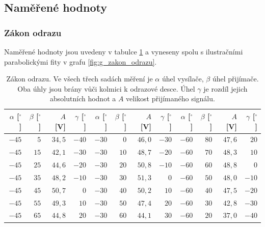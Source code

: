 \documentclass[english]{article}
\begin{document}
\subsection{Naměřené hodnoty}

	\subsubsection{Zákon odrazu}
		Naměřené hodnoty jsou uvedeny v tabulce \ref{tab:zakon_odrazu} a vyneseny spolu s ilustračními parabolickými fity v grafu \ref{fig:g_zakon_odrazu}.
	
	\begin{table}[h]
	\begin{center}
	\begin{tabular}{|r|r|r|r||r|r|r|r||r|r|r|r|}
	\hline
	       $\alpha$ [$^\circ$] & $\beta$ [$^\circ$] & $A$ [V] & $\gamma$ [$^\circ$] & $\alpha$ [$^\circ$] & $\beta$ [$^\circ$] & $A$ [V] & $\gamma$ [$^\circ$] & $\alpha$ [$^\circ$] & $\beta$ [$^\circ$] & $A$ [V] & $\gamma$ [$^\circ$]\\\hline \hline
	       $-45$ & $5$ & $34,5$ & $-40$ & $-30$ & $0$ & $46,0$ & $-30$ & $-60$ & $80$ & $47,6$ & $20$\\\hline
	       $-45$ & $15$ & $42,1$ & $-30$ & $-30$ & $10$ & $48,7$ & $-20$ & $-60$ & $70$ & $48,3$ & $10$\\\hline
	       $-45$ & $25$ & $44,6$ & $-20$ & $-30$ & $20$ & $50,8$ & $-10$ & $-60$ & $60$ & $48,8$ & $0$\\\hline
	       $-45$ & $35$ & $48,2$ & $-10$ & $-30$ & $30$ & $51,3$ & $0$ & $-60$ & $50$ & $48,0$ & $-10$\\\hline
	       $-45$ & $45$ & $50,7$ & $0$ & $-30$ & $40$ & $50,2$ & $10$ & $-60$ & $40$ & $47,5$ & $-20$\\\hline
	       $-45$ & $55$ & $49,3$ & $10$ & $-30$ & $50$ & $47,4$ & $20$ & $-60$ & $30$ & $42,8$ & $-30$\\\hline
	       $-45$ & $65$ & $44,8$ & $20$ & $-30$ & $60$ & $44,1$ & $30$ & $-60$ & $20$ & $37,0$ & $-40$\\\hline
	
	\end{tabular}
	\caption{Zákon odrazu. Ve všech třech sadách měření je $\alpha$ úhel vysílače, $\beta$ úhel přijímače. Oba úhly jsou brány vůči kolmici k odrazové desce. Úhel $\gamma$ je rozdíl jejich absolutních hodnot a $A$ velikost přijímaného signálu.}
	\label{tab:zakon_odrazu}
	\end{center}
	\end{table}
	
\end{document}

